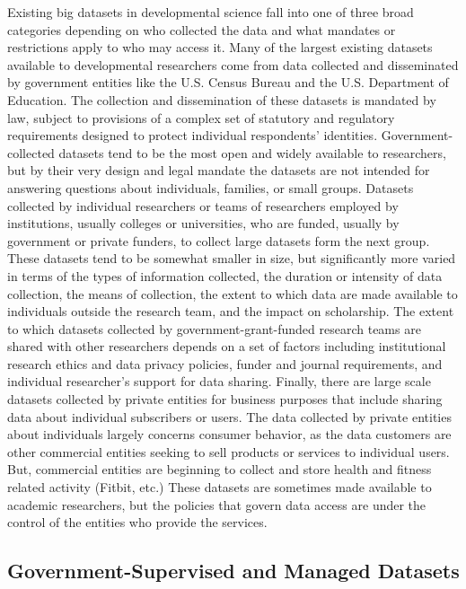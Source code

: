 \documentclass[letterpaper,man,apacite]{apa6}
\begin{document}
Existing big datasets in developmental science fall into one of three broad categories depending on who collected the data and what mandates or restrictions apply to who may access it.
Many of the largest existing datasets available to developmental researchers come from data collected and disseminated by government entities like the U.S. Census Bureau and the U.S. Department of Education.
The collection and dissemination of these datasets is mandated by law, subject to provisions of a complex set of statutory and regulatory requirements designed to protect individual respondents' identities.
Government-collected datasets tend to be the most open and widely available to researchers, but by their very design and legal mandate the datasets are not intended for answering questions about individuals, families, or small groups.
Datasets collected by individual researchers or teams of researchers employed by institutions, usually colleges or universities, who are funded, usually by government or private funders, to collect large datasets form the next group.
These datasets tend to be somewhat smaller in size, but significantly more varied in terms of the types of information collected, the duration or intensity of data collection, the means of collection, the extent to which data are made available to individuals outside the research team, and the impact on scholarship.
The extent to which datasets collected by government-grant-funded research teams are shared with other researchers depends on a set of factors including institutional research ethics and data privacy policies, funder and journal requirements, and individual researcher's support for data sharing.
Finally, there are large scale datasets collected by private entities for business purposes that include sharing data about individual subscribers or users.
The data collected by private entities about individuals largely concerns consumer behavior, as the data customers are other commercial entities seeking to sell products or services to individual users.
But, commercial entities are beginning to collect and store health and fitness related activity (Fitbit, etc.) 
These datasets are sometimes made available to academic researchers, but the policies that govern data access are under the control of the entities who provide the services.

\subsection{Government-Supervised and Managed Datasets}
\end{document}
